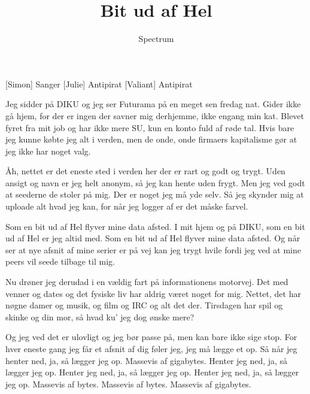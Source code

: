 \documentclass[a4paper,11pt]{article}
\title{Bit ud af Hel}
\author{Spectrum}
\begin{document}
  \maketitle

  \begin{roles}
    [Simon] Sanger
    [Julie] Antipirat
    [Valiant] Antipirat
  \end{roles}

  \begin{song}
      Jeg sidder på DIKU og jeg ser Futurama
      på en meget sen fredag nat.
      Gider ikke gå hjem, for der er ingen der savner mig 
      derhjemme, ikke engang min kat.
      Blevet fyret fra mit job og har ikke mere SU,
      kun en konto fuld af røde tal.
      Hvis bare jeg kunne købte jeg alt i verden, 
      men de onde, onde firmaers kapitalisme
      gør at jeg ikke har noget valg.

      Åh, nettet er det eneste sted i verden her
      der er rart og godt og trygt.
      Uden ansigt og navn er jeg helt anonym,
      så jeg kan hente uden frygt.
      Men jeg ved godt at seederne de stoler på mig.
      Der er noget jeg må yde selv.
      Så jeg skynder mig at uploade alt hvad jeg kan,
      for når jeg logger af er det måske farvel.

      Som en bit ud af Hel flyver mine data afsted.
      I mit hjem og på DIKU, som en bit ud af Hel er jeg altid med. 
      Som en bit ud af Hel flyver mine data afsted.
      Og når ser at nye afsnit af mine serier er på vej
      kan jeg trygt hvile fordi jeg ved at mine peers 
      vil seede tilbage til mig.

      Nu drøner jeg derudad i en vældig fart 
      på informationens motorvej. 
      Det med venner og dates og det fysiske liv 
      har aldrig været noget for mig. 
      Nettet, det har nøgne damer og musik,
      og film og IRC og alt det der.
      Tirsdagen har spil og skinke og din mor,
      så hvad ku' jeg dog ønske mere?

      Og jeg ved det er ulovligt og jeg bør passe på, 
      men kan bare ikke sige stop.
      For hver eneste gang jeg får et afsnit af dig 
      føler jeg, jeg må lægge et op. 
      Så når jeg henter ned, ja, så lægger jeg op.
      Massevis af gigabytes. 
      Henter jeg ned, ja, så lægger jeg op.
      Henter jeg ned, ja, så lægger jeg op.
      Henter jeg ned, ja, så lægger jeg op.
      Massevis af bytes. 
      Massevis af bytes. 
      Massevis af gigabytes. 


\end{song}
\end{document}

